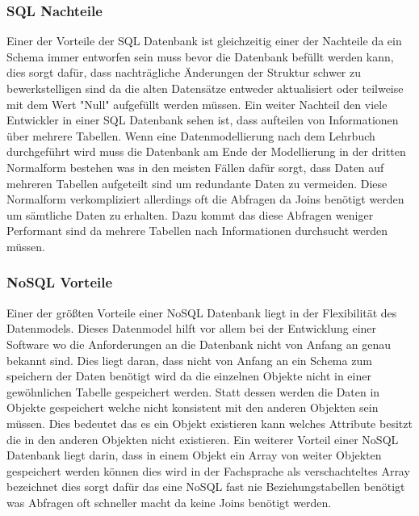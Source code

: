 \documentclass[12pt, letterpaper, twoside]{article}
\begin{document}
	\subsubsection{SQL Nachteile}
		Einer der Vorteile der SQL Datenbank ist gleichzeitig einer der Nachteile da ein Schema immer entworfen sein muss bevor die Datenbank befüllt werden kann, dies sorgt dafür, dass nachträgliche Änderungen der Struktur schwer zu bewerkstelligen sind da die alten Datensätze entweder aktualisiert oder teilweise mit dem Wert "Null" aufgefüllt werden müssen. Ein weiter Nachteil den viele Entwickler in einer SQL Datenbank sehen ist, dass aufteilen von Informationen über mehrere Tabellen. Wenn eine Datenmodellierung nach dem Lehrbuch durchgeführt wird muss die Datenbank am Ende der Modellierung in der dritten Normalform bestehen was in den meisten Fällen dafür sorgt, dass Daten auf mehreren Tabellen aufgeteilt sind um redundante Daten zu vermeiden. Diese Normalform verkompliziert allerdings oft die Abfragen da Joins benötigt werden um sämtliche Daten zu erhalten. Dazu kommt das diese Abfragen weniger Performant sind da mehrere Tabellen nach Informationen durchsucht werden müssen. 
		
	\subsubsection{NoSQL Vorteile}
		Einer der größten Vorteile einer NoSQL Datenbank liegt in der Flexibilität des Datenmodels. Dieses Datenmodel hilft vor allem bei der Entwicklung einer Software wo die Anforderungen an die Datenbank nicht von Anfang an genau bekannt sind. Dies liegt daran, dass nicht von Anfang an ein Schema zum speichern der Daten benötigt wird da die einzelnen Objekte nicht in einer gewöhnlichen Tabelle gespeichert werden. Statt dessen werden die Daten in Objekte gespeichert welche nicht konsistent mit den anderen Objekten sein müssen. Dies bedeutet das es ein Objekt existieren kann welches Attribute besitzt die in den anderen Objekten nicht existieren. Ein weiterer Vorteil einer NoSQL Datenbank liegt darin, dass in einem Objekt ein Array von weiter Objekten gespeichert werden können dies wird in der Fachsprache als verschachteltes Array bezeichnet dies sorgt dafür das eine NoSQL fast nie Beziehungstabellen benötigt was Abfragen oft schneller macht da keine Joins benötigt werden. 
	
\end{document}
